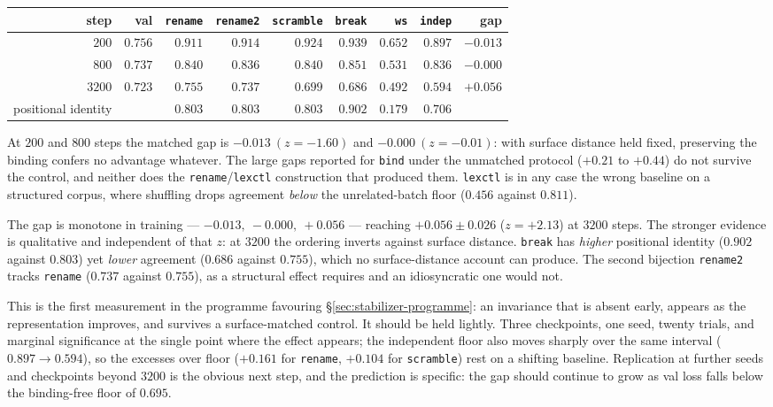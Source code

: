 \begin{center}
\begin{tabular}{rrrrrrrrr}
\hline
step & val & \texttt{rename} & \texttt{rename2} & \texttt{scramble} & \texttt{break} & \texttt{ws} & \texttt{indep} & gap \\
\hline
$200$  & $0.756$ & $0.911$ & $0.914$ & $0.924$ & $0.939$ & $0.652$ & $0.897$ & $-0.013$ \\
$800$  & $0.737$ & $0.840$ & $0.836$ & $0.840$ & $0.851$ & $0.531$ & $0.836$ & $-0.000$ \\
$3200$ & $0.723$ & $0.755$ & $0.737$ & $0.699$ & $0.686$ & $0.492$ & $0.594$ & $+0.056$ \\
\hline
positional identity & & $0.803$ & $0.803$ & $0.803$ & $0.902$ & $0.179$ & $0.706$ & \\
\hline
\end{tabular}
\end{center}

\begin{observation}
\label{obs:gap-retracted}
At $200$ and $800$ steps the matched gap is $-0.013\ (z=-1.60)$ and
$-0.000\ (z=-0.01)$: with surface distance held fixed, preserving the binding
confers no advantage whatever. The large gaps reported for \texttt{bind} under
the unmatched protocol ($+0.21$ to $+0.44$) do not survive the control, and
neither does the \texttt{rename}/\texttt{lexctl} construction that produced
them. \texttt{lexctl} is in any case the wrong baseline on a structured
corpus, where shuffling drops agreement \emph{below} the unrelated-batch floor
($0.456$ against $0.811$).
\end{observation}

\begin{observation}
\label{obs:stabilizer-signal}
The gap is monotone in training --- $-0.013,\ -0.000,\ +0.056$ --- reaching
$+0.056\pm0.026$ ($z=+2.13$) at $3200$ steps. The stronger evidence is
qualitative and independent of that $z$: at $3200$ the ordering inverts against
surface distance. \texttt{break} has \emph{higher} positional identity
($0.902$ against $0.803$) yet \emph{lower} agreement ($0.686$ against
$0.755$), which no surface-distance account can produce. The second bijection
\texttt{rename2} tracks \texttt{rename} ($0.737$ against $0.755$), as a
structural effect requires and an idiosyncratic one would not.
\end{observation}

This is the first measurement in the programme favouring
\S\ref{sec:stabilizer-programme}: an invariance that is absent early, appears
as the representation improves, and survives a surface-matched control. It
should be held lightly. Three checkpoints, one seed, twenty trials, and
marginal significance at the single point where the effect appears; the
independent floor also moves sharply over the same interval ($0.897\to0.594$),
so the excesses over floor ($+0.161$ for \texttt{rename}, $+0.104$ for
\texttt{scramble}) rest on a shifting baseline. Replication at further seeds
and checkpoints beyond $3200$ is the obvious next step, and the prediction is
specific: the gap should continue to grow as val loss falls below the
binding-free floor of $0.695$.

